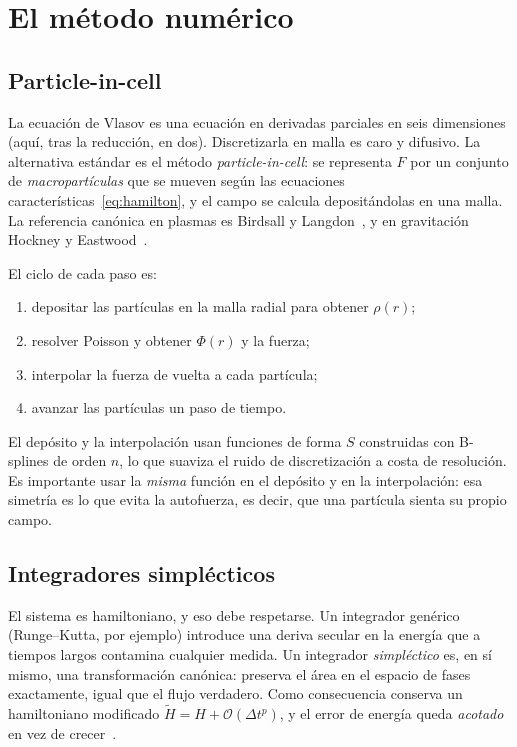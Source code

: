 \documentclass[11pt,a4paper]{article}
\theoremstyle{definition}
\begin{document}
\section{El método numérico}
\label{sec:metodo}

\subsection{Particle-in-cell}

La ecuación de Vlasov es una ecuación en derivadas parciales en seis dimensiones
(aquí, tras la reducción, en dos). Discretizarla en malla es caro y difusivo. La
alternativa estándar es el método \emph{particle-in-cell}: se representa $F$ por un
conjunto de \emph{macropartículas} que se mueven según las ecuaciones
características~\eqref{eq:hamilton}, y el campo se calcula depositándolas en una
malla. La referencia canónica en plasmas es Birdsall y Langdon~\cite{birdsall2004},
y en gravitación Hockney y Eastwood~\cite{hockney1988}.

El ciclo de cada paso es:
\begin{enumerate}
  \item depositar las partículas en la malla radial para obtener $\rho(r)$;
  \item resolver Poisson y obtener $\Phi(r)$ y la fuerza;
  \item interpolar la fuerza de vuelta a cada partícula;
  \item avanzar las partículas un paso de tiempo.
\end{enumerate}

El depósito y la interpolación usan funciones de forma $S$ construidas con
B-splines de orden $n$, lo que suaviza el ruido de discretización a costa de
resolución. Es importante usar la \emph{misma} función en el depósito y en la
interpolación: esa simetría es lo que evita la autofuerza, es decir, que una
partícula sienta su propio campo.

\subsection{Integradores simplécticos}

El sistema es hamiltoniano, y eso debe respetarse. Un integrador genérico
(Runge--Kutta, por ejemplo) introduce una deriva secular en la energía que a
tiempos largos contamina cualquier medida. Un integrador \emph{simpléctico} es, en
sí mismo, una transformación canónica: preserva el área en el espacio de fases
exactamente, igual que el flujo verdadero. Como consecuencia conserva un
hamiltoniano modificado $\tilde H = H + \mathcal{O}(\Delta t^p)$, y el error de
energía queda \emph{acotado} en vez de crecer~\cite{hairer2006}.
\end{document}

